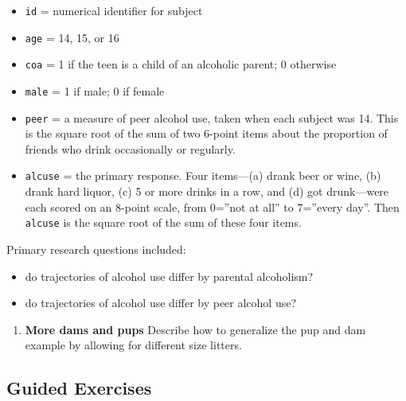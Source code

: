 \documentclass[
]{krantz}
\providecommand{\tightlist}{%
  \setlength{\itemsep}{0pt}\setlength{\parskip}{0pt}}
\begin{document}
\begin{enumerate}
  \begin{itemize}
  \tightlist
  \item
    \texttt{id} = numerical identifier for subject
  \item
    \texttt{age} = 14, 15, or 16
  \item
    \texttt{coa} = 1 if the teen is a child of an alcoholic parent; 0 otherwise
  \item
    \texttt{male} = 1 if male; 0 if female
  \item
    \texttt{peer} = a measure of peer alcohol use, taken when each subject was 14. This is the square root of the sum of two 6-point items about the proportion of friends who drink occasionally or regularly.
  \item
    \texttt{alcuse} = the primary response. Four items---(a) drank beer or wine, (b) drank hard liquor, (c) 5 or more drinks in a row, and (d) got drunk---were each scored on an 8-point scale, from 0=''not at all'' to 7=''every day''. Then \texttt{alcuse} is the square root of the sum of these four items.
  \end{itemize}

  Primary research questions included:

  \begin{itemize}
  \tightlist
  \item
    do trajectories of alcohol use differ by parental alcoholism?
  \item
    do trajectories of alcohol use differ by peer alcohol use?
  \end{itemize}
\end{enumerate}

\begin{enumerate}
\def\labelenumi{\arabic{enumi}.}
\setcounter{enumi}{1}
\tightlist
\item
  \textbf{More dams and pups} Describe how to generalize the pup and dam example by allowing for different size litters.
\end{enumerate}

\hypertarget{guided-exercises-2}{%
\subsection{Guided Exercises}\label{guided-exercises-2}}
\end{document}
